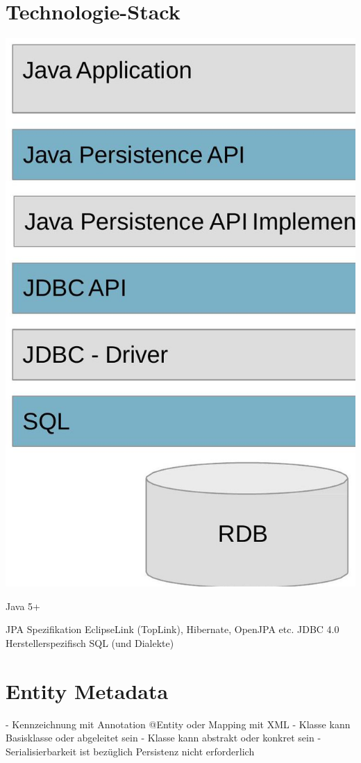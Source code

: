 \section*{Technologie-Stack}

\includegraphics[width=\linewidth]{images/2025_01_02_5ba1dc702e9f94ba8e06g-29.jpg}

Java 5+

JPA Spezifikation
EclipseLink (TopLink), Hibernate, OpenJPA etc.
JDBC 4.0
Herstellerspezifisch
SQL (und Dialekte)

\section*{Entity Metadata}
- Kennzeichnung mit Annotation @Entity oder Mapping mit XML
- Klasse kann Basisklasse oder abgeleitet sein
- Klasse kann abstrakt oder konkret sein
- Serialisierbarkeit ist bezüglich Persistenz nicht erforderlich

